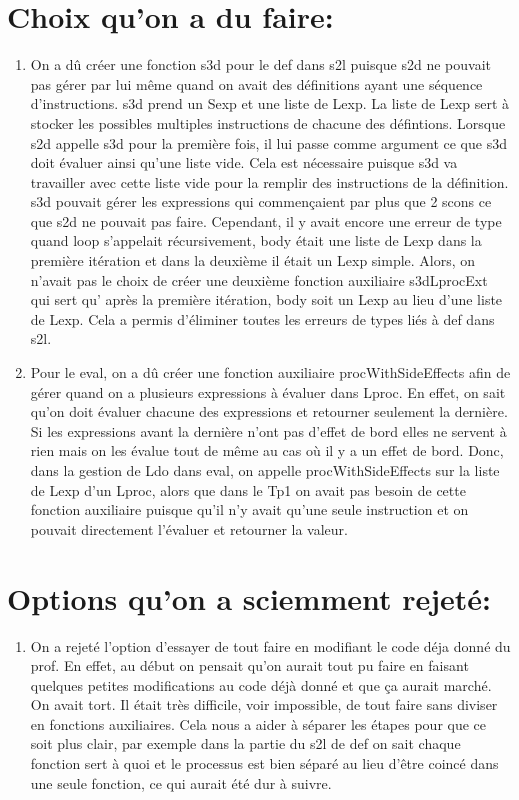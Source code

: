 \documentclass{article}
\begin{document}
\section*{Choix qu’on a du faire:}
\begin{enumerate}
    \item On a dû créer une fonction s3d pour le def dans s2l puisque s2d ne pouvait pas gérer par lui même quand on avait des définitions ayant une séquence d’instructions. s3d prend un Sexp et une liste de Lexp. La liste de Lexp sert à stocker les possibles multiples instructions de chacune des défintions. Lorsque s2d appelle s3d pour la première fois, il lui passe comme argument ce que s3d doit évaluer ainsi qu’une liste vide. Cela est nécessaire puisque s3d va travailler avec cette liste vide pour la remplir des instructions de la définition. s3d pouvait gérer les expressions qui commençaient par plus que 2 scons ce que s2d ne pouvait pas faire. Cependant, il y avait encore une erreur de type quand loop s'appelait récursivement, body était une liste de Lexp dans la première itération et dans la deuxième il était un Lexp simple. Alors, on n'avait pas le choix de créer une deuxième fonction auxiliaire s3dLprocExt qui sert qu' après la première itération, body soit un Lexp au lieu d’une liste de Lexp. Cela a permis d’éliminer toutes les erreurs de types liés à def dans s2l.

    \item Pour le eval, on a dû créer une fonction auxiliaire procWithSideEffects afin de gérer quand on a plusieurs expressions à évaluer dans Lproc. En effet, on sait qu’on doit évaluer chacune des expressions et retourner seulement la dernière.  Si les expressions avant la dernière n’ont pas d’effet de bord elles ne servent à rien mais on les évalue tout de même au cas où il y a un effet de bord. Donc, dans la gestion de Ldo dans eval, on appelle procWithSideEffects sur la liste de Lexp d’un Lproc, alors que dans le Tp1 on avait pas besoin de cette fonction auxiliaire puisque qu’il n’y avait qu’une seule instruction et on pouvait directement l’évaluer et retourner la valeur. 
    
\end{enumerate}

\section*{Options qu’on a sciemment rejeté:}
\begin{enumerate}
    \item On a rejeté l'option d'essayer de tout faire en modifiant le code déja donné du prof. En effet, au début on pensait qu'on aurait tout pu faire en faisant quelques petites modifications au code déjà donné et que ça aurait marché. On avait tort. Il était très difficile, voir impossible, de tout faire sans diviser en fonctions auxiliaires. Cela nous a aider à séparer les étapes pour que ce soit plus clair, par exemple dans la partie du s2l de def on sait chaque fonction sert à quoi et le processus est bien séparé au lieu d'être coincé dans une seule fonction, ce qui aurait été dur à suivre. 
    
    
\end{enumerate}
\end{document}
